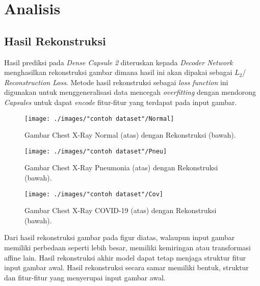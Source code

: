 \documentclass{article}
\begin{document}
	\section{Analisis}
	\subsection{Hasil Rekonstruksi}
		\par
	    Hasil prediksi pada \textit{Dense Capsule 2} diteruskan kepada \textit{Decoder Network} menghasilkan rekonstruksi gambar dimana hasil ini akan dipakai sebagai $L_{2}$/ \textit{Reconstruction Loss}. Metode hasil rekonstruksi sebagai \textit{loss function} ini digunakan untuk menggeneralisasi data mencegah \textit{overfitting} dengan mendorong \textit{Capsules} untuk dapat \textit{encode} fitur-fitur yang terdapat pada input gambar.
		\begin{figure}[h]
	 		\centering
			\caption{Gambar Chest X-Ray Normal (atas) dengan Rekonstruksi (bawah).}
			\texttt{[image: ./images/"contoh dataset"/Normal]}
		\end{figure}
		\begin{figure}[h]
			\centering
			\caption{Gambar Chest X-Ray Pneumonia (atas) dengan Rekonstruksi (bawah).}
			\texttt{[image: ./images/"contoh dataset"/Pneu]}
		\end{figure}
		\begin{figure}[h]
			\centering
			\caption{Gambar Chest X-Ray COVID-19 (atas) dengan Rekonstruksi (bawah).}
			\texttt{[image: ./images/"contoh dataset"/Cov]}
		\end{figure}
		\par
		Dari hasil rekonstruksi gambar pada figur diatas, walaupun input gambar memiliki perbedaan seperti lebih besar, memiliki kemiringan atau transformasi affine lain. Hasil rekonstruksi akhir model dapat tetap menjaga struktur fitur input gambar awal. Hasil rekonstruksi secara samar memiliki bentuk, struktur dan fitur-fitur yang menyerupai input gambar awal.
\end{document}
